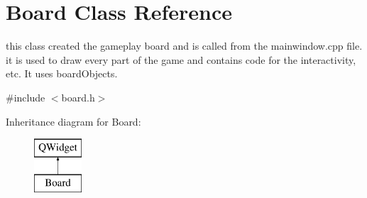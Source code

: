 \hypertarget{class_board}{}\section{Board Class Reference}
\label{class_board}


this class created the gameplay board and is called from the mainwindow.\+cpp file. it is used to draw every part of the game and contains code for the interactivity, etc. It uses board\+Objects.  




{\ttfamily \#include $<$board.\+h$>$}

Inheritance diagram for Board\+:\begin{figure}[H]
\begin{center}
\leavevmode
\includegraphics[height=2.000000cm]{class_board}
\end{center}
\end{figure}
